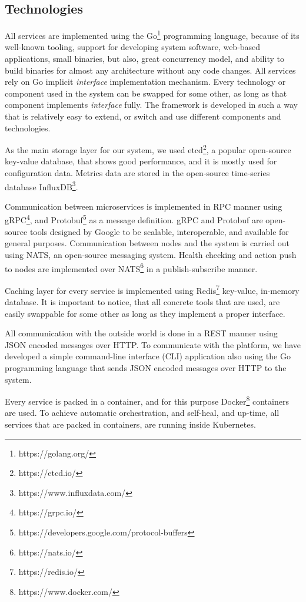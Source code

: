 \subsection{Technologies}\label{sec:technologies}
%
All services are implemented using the Go\footnote{https://golang.org/} programming language, because of its well-known tooling, support for developing system software, web-based applications, small binaries, but also, great concurrency model, and ability to build binaries for almost any architecture without any code changes. All services rely on Go implicit \emph{interface} implementation mechanism. Every technology or component used in the system can be swapped for some other, as long as that component implements \emph{interface} fully. The framework is developed in such a way that is relatively easy to extend, or switch and use different components and technologies.

As the main storage layer for our system, we used etcd\footnote{https://etcd.io/}, a popular open-source key-value database, that shows good performance, and it is mostly used for configuration data. Metrics data are stored in the open-source time-series database InfluxDB\footnote{https://www.influxdata.com/}. 

Communication between microservices is implemented in RPC manner using gRPC\footnote{https://grpc.io/}, and Protobuf\footnote{https://developers.google.com/protocol-buffers} as a message definition. gRPC and Protobuf are open-source tools designed by Google to be scalable, interoperable, and available for general purposes. Communication between nodes and the system is carried out using NATS, an open-source messaging system. Health checking and action push to nodes are implemented over NATS\footnote{https://nats.io/} in a publish-subscribe manner.

Caching layer for every service is implemented using Redis\footnote{https://redis.io/} key-value, in-memory database. It is important to notice, that all concrete tools that are used, are easily swappable for some other as long as they implement a proper interface.

All communication with the outside world is done in a REST manner using JSON encoded messages over HTTP. To communicate with the platform, we have developed a simple command-line interface (CLI) application also using the Go programming language that sends JSON encoded messages over HTTP to the system.

Every service is packed in a container, and for this purpose Docker\footnote{https://www.docker.com/} containers are used. To achieve automatic orchestration, and self-heal, and up-time, all services that are packed in containers, are running inside Kubernetes.

